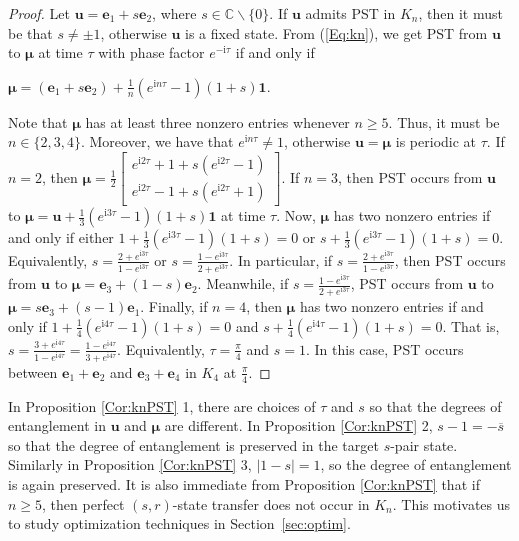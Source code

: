\documentclass{article}
\numberwithin{equation}{section}
\newcommand{\uno}{\mathbf 1}
\newcommand{\be}{\mathbf e}
\newcommand{\bu}{\mathbf u}
\newcommand{\bmu}{{\boldsymbol{\mu}}}
\def\C{\mathbb{C}}
\def\ii{\mathrm{i}}
\begin{document}
{\begin{proof}
Let $\bu=\be_1+s\be_2$, where $s\in\C\backslash\{0\}$. If $\bu$ admits PST in $K_n$, then it must be that $s\neq \pm 1$, otherwise $\bu$ is a fixed state. From (\ref{Eq:kn}), we get PST from $\bu$ to $\bmu$ at time $\tau$ with phase factor $e^{-\ii\tau}$ if and only if 
\begin{center}
$\bmu=(\be_1+s\be_2)+\frac{1}{n}(e^{\ii n \tau}-1)(1+s)\uno.$
\end{center}
Note that $\bmu$ has at least three nonzero entries whenever $n\geq 5$. Thus, it must be $n\in\{2,3,4\}$. Moreover, we have that $e^{\ii n \tau}\neq 1$, otherwise $\bu=\bmu$ is periodic at $\tau$. If $n=2$, then $\bmu=\frac{1}{2}\left[\begin{array}{cc} e^{\ii2\tau}+1+s(e^{\ii2\tau}-1) \\ e^{\ii2\tau}-1+s(e^{\ii2\tau}+1) \end{array} \right]$. If $n=3$, then PST occurs from $\bu$ to $\bmu=\bu+\frac{1}{3}(e^{\ii3\tau }-1)(1+s)\uno$ at time $\tau$.  Now, $\bmu$ has two nonzero entries if and only if either $1+\frac{1}{3}(e^{\ii3\tau }-1)(1+s)=0$ or $s+\frac{1}{3}(e^{\ii3\tau }-1)(1+s)=0$. Equivalently, $s=\frac{2+e^{\ii3\tau}}{1-e^{\ii 3\tau}}$ or $s=\frac{1-e^{\ii 3\tau}}{2+e^{\ii 3\tau}}$. In particular, if $s=\frac{2+e^{\ii3\tau}}{1-e^{\ii 3\tau}}$, then PST occurs from $\bu$ to $\bmu=\be_3+(1-s)\be_2$. Meanwhile, if $s=\frac{1-e^{\ii 3\tau}}{2+e^{\ii 3\tau}}$, PST occurs from $\bu$ to $\bmu=s\be_3+(s-1)\be_1$. Finally, if $n=4$, then $\bmu$ has two nonzero entries if and only if $1+\frac{1}{4}(e^{\ii4\tau }-1)(1+s)=0$ and $s+\frac{1}{4}(e^{\ii4\tau }-1)(1+s)=0$. That is, $s=\frac{3+e^{\ii 4\tau}}{1-e^{\ii 4\tau}}=\frac{1-e^{\ii 4\tau}}{3+e^{\ii 4\tau}}$. Equivalently, $\tau=\frac{\pi}{4}$ and $s=1$. In this case, PST occurs between $\be_1+\be_2$ and $\be_3+\be_4$ in $K_4$ at $\frac{\pi}{4}$.
\end{proof}

In Proposition \ref{Cor:knPST} 1, there are choices of $\tau$ and $s$ so that the degrees of entanglement in $\bu$ and $\bmu$ are different. In Proposition \ref{Cor:knPST} 2, $s-1=-\overline{s}$ so that the degree of entanglement is preserved in the target $s$-pair state. Similarly in Proposition \ref{Cor:knPST} 3, $|1-s|=1$, so the degree of entanglement is again preserved. It is also immediate from Proposition \ref{Cor:knPST} that if $n\geq 5$, then perfect $(s,r)$-state transfer does not occur in $K_n$. This motivates us to study optimization techniques in Section~\ref{sec:optim}. 


}
\end{document}
